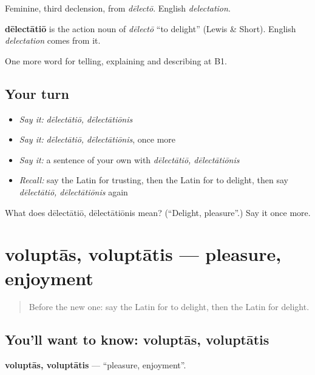 Feminine, third declension, from \emph{dēlectō}. English \emph{delectation}.

\begin{cousinweb}
\textbf{dēlectātiō} is the action noun of \emph{dēlectō} \textquotedblleft{}to delight\textquotedblright{} (Lewis \& Short). English \emph{delectation} comes from it.
\end{cousinweb}

\begin{grammarlens}[title={What you've built}]
One more word for telling, explaining and describing at B1.
\end{grammarlens}

\subsection*{Your turn}
\begin{itemize}
\raggedright
  \item \emph{Say it:} \emph{dēlectātiō, dēlectātiōnis}
  \item \emph{Say it:} \emph{dēlectātiō, dēlectātiōnis}, once more
  \item \emph{Say it:} a sentence of your own with \emph{dēlectātiō, dēlectātiōnis}
  \item \emph{Recall:} say the Latin for trusting, then the Latin for to delight, then say \emph{dēlectātiō, dēlectātiōnis} again
\end{itemize}

\begin{tcolorbox}[breakable,colback=teal!4,colframe=teal!35!black,title={Before you move on}]
What does dēlectātiō, dēlectātiōnis mean? (\textquotedblleft{}Delight, pleasure\textquotedblright{}.) Say it once more.
\end{tcolorbox}
\section[voluptās, voluptātis]{voluptās, voluptātis — pleasure, enjoyment}

\label{lesson:LA-C499-voluptas}



\begin{quote}
Before the new one: say the Latin for to delight, then the Latin for delight.
\end{quote}

\subsection*{You'll want to know: voluptās, voluptātis}
\textbf{voluptās, voluptātis} — \textquotedblleft{}pleasure, enjoyment\textquotedblright{}.

